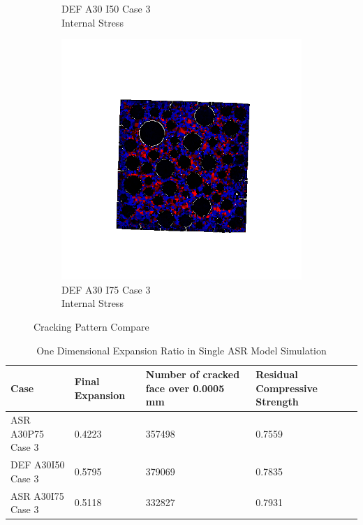 \begin{figure}[ht!]
\begin{subfigure}{.33\textwidth}
      \caption{DEF A30 I50 Case 3 \\ Internal Stress}
    \end{subfigure}%
    \begin{subfigure}{.33\textwidth}
      \centering
      \includegraphics[width=1.0\linewidth]{Files/exp_3D/DEF/A30X-5C_3_stress.png}
      \caption{DEF A30 I75 Case 3 \\ Internal Stress}
    \end{subfigure}
  \caption{Cracking Pattern Compare}
  \label{fig:ASR_A30P75_3_3Dsss}
\end{figure}

\begin{table}[ht!]
  \caption{One Dimensional Expansion Ratio in Single ASR Model Simulation}
\centering
\begin{tabular}{ |p{4cm}|p{2cm}|p{3cm}|p{3cm}| }
 \hline
 Case &  Final Expansion  & Number of cracked face over 0.0005 mm & Residual Compressive Strength\\ [0.5ex]
 \hline
 ASR A30P75 Case 3 & 0.4223 & 357498 & 0.7559 \\ \hline
 DEF A30I50 Case 3 & 0.5795 & 379069 & 0.7835 \\ \hline
 ASR A30I75 Case 3 & 0.5118 & 332827 & 0.7931 \\
 \hline
\end{tabular}

\label{table:ASRs_30_EXP}
\end{table}

